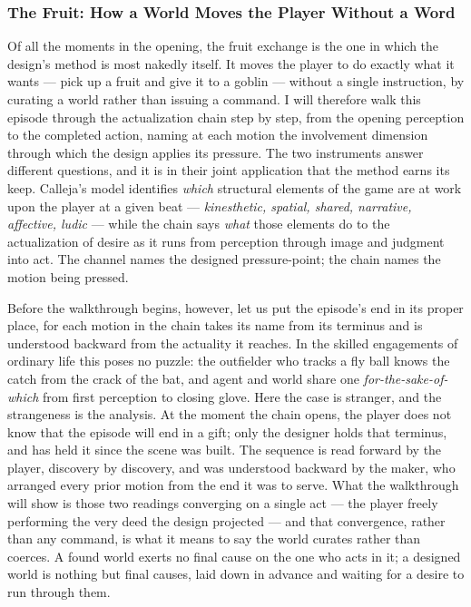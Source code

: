 \documentclass{article}
\begin{document}
\subsubsection*{The Fruit: How a World Moves the Player Without a Word}

Of all the moments in the opening, the fruit exchange is the one in which the design's method is most nakedly itself. It moves the player to do exactly what it wants — pick up a fruit and give it to a goblin — without a single instruction, by curating a world rather than issuing a command. I will therefore walk this episode through the actualization chain step by step, from the opening perception to the completed action, naming at each motion the involvement dimension through which the design applies its pressure. The two instruments answer different questions, and it is in their joint application that the method earns its keep. Calleja's model identifies \textit{which} structural elements of the game are at work upon the player at a given beat — \textit{kinesthetic, spatial, shared, narrative, affective, ludic} — while the chain says \textit{what} those elements do to the actualization of desire as it runs from perception through image and judgment into act. The channel names the designed pressure-point; the chain names the motion being pressed.

Before the walkthrough begins, however, let us put the episode's end in its proper place, for each motion in the chain takes its name from its terminus and is understood backward from the actuality it reaches. In the skilled engagements of ordinary life this poses no puzzle: the outfielder who tracks a fly ball knows the catch from the crack of the bat, and agent and world share one \textit{for-the-sake-of-which} from first perception to closing glove. Here the case is stranger, and the strangeness is the analysis. At the moment the chain opens, the player does not know that the episode will end in a gift; only the designer holds that terminus, and has held it since the scene was built. The sequence is read forward by the player, discovery by discovery, and was understood backward by the maker, who arranged every prior motion from the end it was to serve. What the walkthrough will show is those two readings converging on a single act — the player freely performing the very deed the design projected — and that convergence, rather than any command, is what it means to say the world curates rather than coerces. A found world exerts no final cause on the one who acts in it; a designed world is nothing but final causes, laid down in advance and waiting for a desire to run through them.
\end{document}
